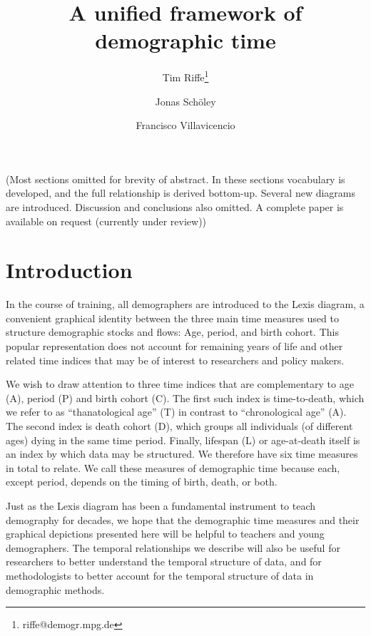 \documentclass[11pt,oneside,a4paper]{article} %
\begin{document}
\title{A unified framework of demographic time}
\author[1]{Tim Riffe\thanks{riffe@demogr.mpg.de}}
\author[2,3]{Jonas Sch{\"o}ley}
\author[2,3]{Francisco Villavicencio}

\maketitle
\vspace{1em}
(Most sections omitted for brevity of abstract. In these
sections vocabulary is developed, and the full relationship is derived
bottom-up. Several new diagrams are introduced. Discussion and conclusions also
omitted. A complete paper is available on request (currently under review))

\section*{Introduction}
In the course of training, all demographers are introduced
to the Lexis diagram, a convenient graphical identity between the three main
time measures used to structure demographic stocks and flows: Age, period, and birth cohort.
This popular representation does not account for remaining years of life and
other related time indices that may be of interest to researchers and
policy makers. %

We wish to draw attention to three time indices that are complementary to age
(A), period (P) and birth cohort (C). The first such index is time-to-death,
which we refer to as ``thanatological age'' (T) in contrast to ``chronological
age'' (A). The second index is death cohort (D), which groups all individuals
(of different ages) dying in the same time period. Finally, lifespan (L) or
age-at-death itself is an index by which data may be structured.
We therefore have six time measures in total to relate. We call these measures of demographic
time because each, except period, depends on the timing of birth, death, or
both.

Just as the Lexis diagram has been a fundamental instrument to
teach demography for decades, we hope that the demographic time measures and
their graphical depictions presented here will be helpful to teachers and
young demographers. The temporal relationships we describe will also be useful
for researchers to better understand the temporal structure of data, and for methodologists to
better account for the temporal structure of data in demographic methods.
\end{document}

